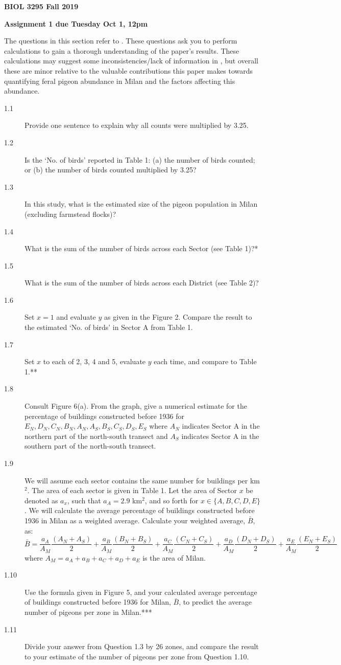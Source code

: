 \documentclass[11pt, oneside]{article}   	%
\begin{document}
\textbf{BIOL 3295 Fall 2019}

\textbf{Assignment 1 due Tuesday Oct 1, 12pm}

The questions in this section refer to \cite{Sacchi}. These questions ask you to perform calculations to gain a thorough understanding of the paper's results. These calculations may suggest some inconsistencies/lack of information in \cite{Sacchi}, but overall these are minor relative to the valuable contributions this paper makes towards quantifying feral pigeon abundance in Milan and the factors affecting this abundance. 

\begin{description}
\item[1.1] Provide one sentence to explain why all counts were multiplied by 3.25.
\item[1.2] Is the `No. of birds' reported in Table 1: (a) the number of birds counted; or (b) the number of birds counted multiplied by 3.25?
\item[1.3] In this study, what is the estimated size of the pigeon population in Milan (excluding farmstead flocks)?
\item[1.4] What is the sum of the number of birds across each Sector (see Table 1)?*
\item[1.5] What is the sum of the number of birds across each District (see Table 2)? 
\item[1.6] Set $x = 1$ and evaluate $y$ as given in the Figure 2. Compare the result to the estimated `No. of birds' in Sector A from Table 1.
\item[1.7] Set $x$ to each of 2, 3, 4 and 5, evaluate $y$ each time, and compare to Table 1.**
\item[1.8] Consult Figure 6(a). From the graph, give a numerical estimate for the percentage of buildings constructed before 1936 for $E_N, D_N, C_N, B_N, A_N, A_S, B_S, C_S, D_S, E_S$ where $A_N$ indicates Sector A in the northern part of the north-south transect and $A_S$ indicates Sector A in the southern part of the north-south transect.
\item[1.9] We will assume each sector contains the same number for buildings per km$^2$. The area of each sector is given in Table 1. Let the area of Sector $x$ be denoted as $a_x$, such that $a_A = 2.9$ km$^2$, and so forth for $x \in \{A, B, C, D, E\}$.  We will calculate the average percentage of buildings constructed before 1936 in Milan as a weighted average. Calculate your weighted average, $\bar{B}$, as:
\[\bar{B} = \frac{a_A}{A_M}\frac{(A_N+A_S)}{2}+\frac{a_B}{A_M}\frac{(B_N+B_S)}{2}+\frac{a_C}{A_M}\frac{(C_N+C_S)}{2}+\frac{a_D}{A_M}\frac{(D_N+D_S)}{2}+\frac{a_E}{A_M}\frac{(E_N+E_S)}{2}\]
where $A_M = a_A + a_B + a_C + a_D + a_E$ is the area of Milan. 
\item[1.10] Use the formula given in Figure 5, and your calculated average percentage of buildings constructed before 1936 for Milan, $\bar{B}$, to predict the average number of pigeons per zone in Milan.***
\item[1.11] Divide your answer from Question 1.3 by 26 zones, and compare the result to your estimate of the number of pigeons per zone from Question 1.10.
\end{description}
\end{document}
